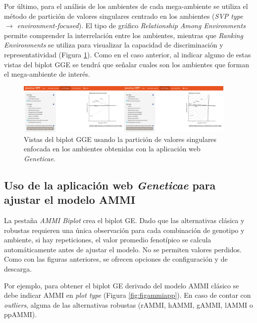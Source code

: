 Por último, para el análisis de los ambientes de cada mega-ambiente se utiliza el método de partición de valores singulares centrado en los ambientes (\emph{SVP type $\rightarrow$ environment-focused}). El tipo de gráfico \emph{Relationship Among Environments} permite comprender la interrelación entre los ambientes, mientras que \emph{Ranking Environments} se utiliza para visualizar la capacidad de discriminación y representatividad (Figura \ref{fig:ggebip3}). Como en el caso anterior, al indicar alguno de estas vistas del biplot GGE se tendrá que señalar cuales son los ambientes que forman el mega-ambiente de interés. 


\begin{figure}[H]
	\begin{center}
		\includegraphics[width=0.95\textwidth]{./Graficos/www/GGE_biplotAPP3.png}
	\end{center}
	\caption{Vistas del biplot GGE usando la partición de valores singulares enfocada en los ambientes obtenidas con la aplicación web \emph{Geneticae}.}
	\label{fig:ggebip3}
\end{figure}


\subsection{Uso de la aplicación web \emph{Geneticae} para ajustar el modelo AMMI}

La pestaña \emph{AMMI Biplot} crea el biplot GE. Dado que las alternativas clásica y robustas requieren una única observación para cada combinación de genotipo y ambiente, si hay repeticiones, el valor promedio fenotípico se calcula automáticamente antes de ajustar el modelo. No se permiten valores perdidos. Como con las figuras anteriores, se ofrecen opciones de configuración y de descarga.

Por ejemplo, para obtener el biplot GE derivado del modelo AMMI clásico se debe indicar AMMI en \emph{plot type} (Figura \ref{fig:figammiapp}). En caso de contar con \emph{outliers}, alguna de las alternativas robustas (rAMMI, hAMMI, gAMMI, lAMMI o ppAMMI).
 


